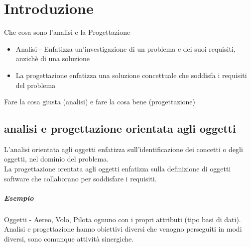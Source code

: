 \chapter{Introduzione}
Che cosa sono l'analisi e la Progettazione
\begin{itemize}
    \item Analisi - Enfatizza un'investigazione di un problema e dei suoi
    requisiti, anzichè di una soluzione
    \item La progettazione enfatizza una soluzione concettuale che soddisfa i requisiti
    del problema
\end{itemize}
Fare la cosa giusta (analisi) e fare la cosa bene (progettazione)
\section{analisi e progettazione orientata agli oggetti}
L'analisi orientata agli oggetti enfatizza sull'identificazione dei concetti o
degli oggetti, nel dominio del problema.
\\ La progettazione orentata agli oggetti enfatizza sulla definizione di oggetti
software che collaborano per soddisfare i requisiti.
\paragraph*{Esempio} Oggetti - Aereo, Volo, Pilota ognuno con i propri attributi
(tipo basi di dati).
Analisi e progettazione hanno obiettivi diversi che venogno perseguiti in modi diversi,
sono comunque attività sinergiche.

